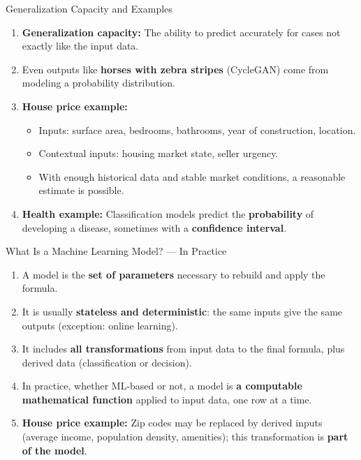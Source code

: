 \begin{frame}{Generalization Capacity and Examples}
\begin{enumerate}
\item<1-> \textbf{Generalization capacity:} The ability to predict accurately for cases not exactly like the input data.
\item<2-> Even outputs like \textbf{horses with zebra stripes} (CycleGAN) come from modeling a probability distribution.
\item<3-> \textbf{House price example:}
    \begin{itemize}
    \item Inputs: surface area, bedrooms, bathrooms, year of construction, location.
    \item Contextual inputs: housing market state, seller urgency.
    \item With enough historical data and stable market conditions, a reasonable estimate is possible.
    \end{itemize}
\item<4-> \textbf{Health example:} Classification models predict the \textbf{probability} of developing a disease, sometimes with a \textbf{confidence interval}.
\end{enumerate}
\end{frame}

\begin{frame}{What Is a Machine Learning Model? --- In Practice}
\begin{enumerate}
\item<1-> A model is the \textbf{set of parameters} necessary to rebuild and apply the formula.
\item<2-> It is usually \textbf{stateless and deterministic}: the same inputs give the same outputs (exception: online learning).
\item<3-> It includes \textbf{all transformations} from input data to the final formula, plus derived data (classification or decision).
\item<4-> In practice, whether ML-based or not, a model is \textbf{a computable mathematical function} applied to input data, one row at a time.
\item<5-> \textbf{House price example:} Zip codes may be replaced by derived inputs (average income, population density, amenities); this transformation is \textbf{part of the model}.
\end{enumerate}
\end{frame}

